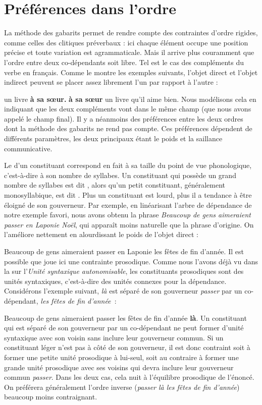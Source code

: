 \section{Préférences dans l’ordre}\label{sec:3.5.21}

La méthode des gabarits permet de rendre compte des contraintes d’ordre rigides, comme celles des clitiques préverbaux : ici chaque élément occupe une position précise et toute variation est agrammaticale. Mais il arrive plus couramment que l’ordre entre deux co-dépendants soit libre. Tel est le cas des compléments du verbe en français. Comme le montre les exemples suivants, l’objet direct et l’objet indirect peuvent se placer assez librement l’un par rapport à l’autre :

\ea {} un livre \textbf{{à sa sœur.}}
     \textbf{{à sa sœur}} un livre qu’il aime bien.
    \z
\z
Nous modélisons cela en indiquant que les deux compléments vont dans le même champ (que nous avons appelé le champ final). Il y a néanmoins des préférences entre les deux ordres dont la méthode des gabarits ne rend pas compte. Ces préférences dépendent de différents paramètres, les deux principaux étant le poids et la saillance communicative.

Le  d’un constituant correspond en fait à sa taille du point de vue phonologique, c’est-à-dire à son nombre de syllabes. Un constituant qui possède un grand nombre de syllabes est dit , alors qu’un petit constituant, généralement monosyllabique, est dit . Plus un constituant est lourd, plus il a tendance à être éloigné de son gouverneur. Par exemple, en linéarisant l’arbre de dépendance de notre exemple favori, nous avons obtenu la phrase \textit{Beaucoup de gens aimeraient passer en Laponie Noël}, qui apparaît moins naturelle que la phrase d’origine. On l’améliore nettement en alourdissant le poids de l’objet direct :

\ea
    {Beaucoup de gens aimeraient passer en Laponie les fêtes de fin d’année}.
\z
Il est possible que joue ici une contrainte prosodique. Comme nous l’avons déjà vu dans la  sur l’\textit{Unité syntaxique autonomisable}, les constituants prosodiques sont des unités syntaxiques, c’est-à-dire des unités connexes pour la dépendance. Considérons l’exemple suivant, \textit{là} est séparé de son gouverneur \textit{passer} par un co-dépendant, \textit{les fêtes de fin d’année~}:

\ea
{Beaucoup de gens aimeraient passer les fêtes de fin d’année} \textbf{{là}}.
\z
Un constituant qui est séparé de son gouverneur par un co-dépendant ne peut former d’unité syntaxique avec son voisin sans inclure leur gouverneur commun. Si un constituant léger n’est pas à côté de son gouverneur, il est donc contraint soit à former une petite unité prosodique à lui-seul, soit au contraire à former une grande unité prosodique avec ses voisins qui devra inclure leur gouverneur commun \textit{passer}. Dans les deux cas, cela nuit à l’équilibre prosodique de l’énoncé. On préférera généralement l’ordre inverse (\textit{passer là les fêtes de fin d’année}) beaucoup moins contraignant.

